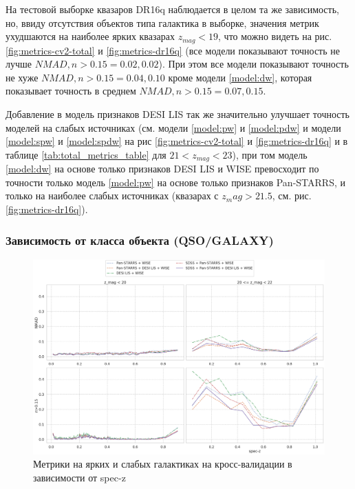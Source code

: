\documentclass[fleqn,usenatbib]{mnras}
\begin{document}
На тестовой выборке квазаров DR16q наблюдается в целом та же зависимость, но, ввиду отсутствия объектов типа галактика в выборке, значения метрик ухудшаются на наиболее ярких квазарах $z_{mag} < 19$, что можно видеть на рис. \ref{fig:metrics-cv2-total} и \ref{fig:metrics-dr16q} (все модели показывают точность не лучше $NMAD, n>0.15 = 0.02, 0.02$). При этом все модели показывают точность не хуже $NMAD, n>0.15 = 0.04, 0.10$ кроме модели \ref{model:dw}, которая показывает точность в среднем $NMAD, n>0.15 = 0.07, 0.15$.

Добавление в модель признаков DESI LIS так же значительно улучшает точность моделей на слабых источниках (см. модели \ref{model:pw} и \ref{model:pdw} и модели \ref{model:spw} и \ref{model:spdw} на рис \ref{fig:metrics-cv2-total} и \ref{fig:metrics-dr16q} и в таблице \ref{tab:total_metrics_table} для $21 < z_{mag} < 23$), при том модель \ref{model:dw} на основе только признаков DESI LIS и WISE превосходит по точности только модель \ref{model:pw} на основе только признаков Pan-STARRS, и только на наиболее слабых источниках (квазарах с $z_mag > 21.5$, см. рис. \ref{fig:metrics-dr16q}).

\clearpage
\subsubsection{Зависимость от класса объекта (QSO/GALAXY)}
\begin{figure}
    \centering
    \includegraphics[width=0.99\linewidth]{images/class-galaxy-cv2.png}
    \caption{Метрики на ярких и слабых галактиках на кросс-валидации в зависимости от spec-z}
    \label{fig:class-galaxy-cv2}
\end{figure}
\end{document}

